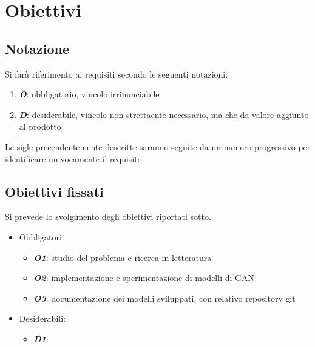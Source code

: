 \section{Obiettivi}
\subsection*{Notazione}
Si farà riferimento ai requisiti secondo le seguenti notazioni:
\begin{enumerate}
  \item \textbf{\textit{O}}: obbligatorio, vincolo irrinunciabile
  \item \textbf{\textit{D}}: desiderabile, vincolo non strettaente necessario, ma che da valore aggiunto al prodotto
\end{enumerate}
Le sigle precendentemente descritte saranno seguite da un numero progressivo per identificare univocamente il requisito.

\subsection*{Obiettivi fissati}
Si prevede lo svolgimento degli obiettivi riportati sotto.
\begin{itemize}
  \item Obbligatori:
  \begin{itemize}
    \item \textbf{\textit{O1}}: studio del problema e ricerca in letteratura
    \item \textbf{\textit{O2}}: implementazione e sperimentazione di modelli di GAN
    \item \textbf{\textit{O3}}: documentazione dei modelli sviluppati, con relativo repository git
  \end{itemize}
  \item Desiderabili:
  \begin{itemize}
    \item \textbf{\textit{D1}}: 
  \end{itemize}
\end{itemize}

